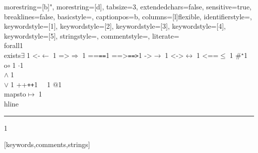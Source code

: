 {morestring=[b]",
morestring=[d],
tabsize=3,
extendedchars=false,
sensitive=true,
breaklines=false,
basicstyle=\small,
captionpos=b,
columns=[l]flexible,
identifierstyle={\ttfamily\color{black}},
keywordstyle=[1]{\ttfamily\color{dkviolet}},
keywordstyle=[2]{\ttfamily\color{dkgreen}},
keywordstyle=[3]{\ttfamily\color{ltblue}},
keywordstyle=[4]{\ttfamily\color{dkblue}},
keywordstyle=[5]{\ttfamily\color{dkred}},
stringstyle=\ttfamily,
commentstyle={\ttfamily\color{dkgreen}},
literate=
  {\\forall}{{\color{dkgreen}{$\forall\;$}}}1
{\\exists}{{$\exists\;$}}1
{<-}{{$\leftarrow\;$}}1
{=>}{{$\Rightarrow\;$}}1
{==}{{\texttt{==}\;}}1
{==>}{{\texttt{==>}\;}}1
{->}{{$\rightarrow\;$}}1
{<->}{{$\leftrightarrow\;$}}1
{<==}{{$\leq\;$}}1
{\#}{{$^\star$}}1
{\\o}{{$\circ\;$}}1
{\@}{{$\cdot$}}1
{\/\\}{{$\wedge\;$}}1
{\\\/}{{$\vee\;$}}1
{++}{{\texttt{++}}}1
{~}{{\ }}1
{\@\@}{{$@$}}1
{\\mapsto}{{$\mapsto\;$}}1
{\\hline}{{\rule{\linewidth}{0.5pt}}}1
%
}[keywords,comments,strings]
